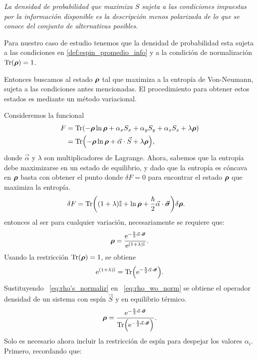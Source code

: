 \documentclass[../Main.tex]{subfiles}
\begin{document}
\emph{La densidad de probabilidad que maximiza $S$ sujeta a las condiciones impuestas por la información disponible es la descripción menos polarizada de lo que se conoce del conjunto de alternativas posibles.}

Para nuestro caso de estudio tenemos que la densidad de probabilidad esta sujeta a las condiciones en \eqref{def:espin_promedio_info} y a la condición de normalización $\Tr(\bm{\rho})=1$.

Entonces buscamos al estado $\bm{\rho}$ tal que maximiza a la entropía de Von-Neumann, sujeta a las condiciones antes mencionadas. El procedimiento para obtener estos estados es mediante un método variacional.

Consideremos la funcional
\begin{align}
    F
    &=\Tr(-\bm{\rho}\ln\bm{\rho}+\alpha_xS_x+\alpha_yS_y+\alpha_zS_z+\lambda\bm{\rho})\notag\\
    &=\Tr(-\bm{\rho}\ln\bm{\rho} + \vec{\alpha}\cdot\vec{S}+\lambda\bm{\rho}),
\end{align}
donde $\vec{\alpha}$ y $\lambda$ son multiplicadores de Lagrange. Ahora, sabemos que la entropía debe maximizarse en un estado de equilibrio, y dado que la entropía es cóncava en $\bm{\rho}$ basta con obtener el punto donde $\delta F = 0$ para encontrar el estado $\bm{\rho}$ que maximiza la entropía.
\begin{align}
\delta F
&= \Tr((1+\lambda)\mathbb{I}+\ln\bm{\rho}+\frac{\hbar}{2}\vec{\alpha}\cdot\vec{\bm{\sigma}})\delta\bm{\rho}.
\label{eq:multiplicadores}
\end{align}
entonces al ser para cualquier variación, necesariamente se requiere que:
\begin{equation}
    \bm{\rho} = \frac{\mathrm{e}^{-\frac{\hbar}{2}\vec{\alpha}\cdot \vec{\bm{\sigma}}}}{\mathrm{e}^{(1+\lambda)\mathbb{I}}}.
    \label{eq:rho_wo_norm}
\end{equation}
Usando la restricción $\Tr(\bm{\rho})=1$, se obtiene
\begin{equation}
    \mathrm{e}^{(1+\lambda)\mathbb{I}}=\Tr(\mathrm{e}^{-\frac{\hbar}{2}\vec{\alpha}\cdot\vec{\bm{\sigma}}}).
    \label{eq:rho's_normaliz}
\end{equation}
Sustituyendo ~\eqref{eq:rho's_normaliz} en ~\eqref{eq:rho_wo_norm} se obtiene el operador densidad de un sistema con espín $\vec{S}$ y en equilibrio térmico.
\begin{equation}
    \bm{\rho} = \frac{\mathrm{e}^{-\frac{\hbar}{2}\vec{\alpha}\cdot\vec{\bm{\sigma}}}}{\Tr(\mathrm{e}^{-\frac{\hbar}{2}\vec{\alpha}\cdot\vec{\bm{\sigma}}})}.
    \label{eq:rho_semifinal}
\end{equation}
Solo es necesario ahora incluir la restricción de espín para despejar los valores $\alpha_i$. Primero, recordando que:
\end{document}
